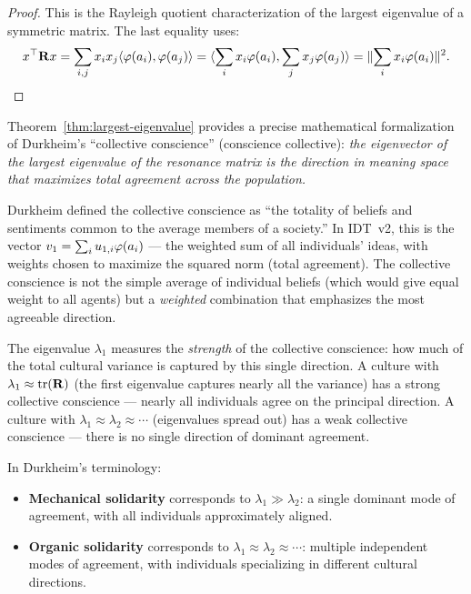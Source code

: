 \begin{proof}
This is the Rayleigh quotient characterization of the largest eigenvalue of
a symmetric matrix. The last equality uses:
\[
  x^\top \mathbf{R} x = \sum_{i,j} x_i x_j \langle \varphi(a_i), \varphi(a_j) \rangle
  = \langle \sum_i x_i \varphi(a_i), \sum_j x_j \varphi(a_j) \rangle
  = \lVert \sum_i x_i \varphi(a_i) \rVert^2.
\]
\end{proof}

\begin{interpretation}
\label{interp:durkheim}
Theorem~\ref{thm:largest-eigenvalue} provides a precise mathematical
formalization of Durkheim's ``collective conscience'' (conscience collective):
\emph{the eigenvector of the largest eigenvalue of the resonance matrix is the
direction in meaning space that maximizes total agreement across the
population.}

Durkheim defined the collective conscience as ``the totality of beliefs and
sentiments common to the average members of a society.'' In IDT~v2, this is
the vector $v_1 = \sum_i u_{1,i} \varphi(a_i)$ --- the weighted sum of all
individuals' ideas, with weights chosen to maximize the squared norm (total
agreement). The collective conscience is not the simple average of individual
beliefs (which would give equal weight to all agents) but a \emph{weighted}
combination that emphasizes the most agreeable direction.

The eigenvalue $\lambda_1$ measures the \emph{strength} of the collective
conscience: how much of the total cultural variance is captured by this single
direction. A culture with $\lambda_1 \approx \operatorname{tr}(\mathbf{R})$ (the
first eigenvalue captures nearly all the variance) has a strong collective
conscience --- nearly all individuals agree on the principal direction. A
culture with $\lambda_1 \approx \lambda_2 \approx \cdots$ (eigenvalues spread
out) has a weak collective conscience --- there is no single direction of
dominant agreement.

In Durkheim's terminology:
\begin{itemize}
\item \textbf{Mechanical solidarity} corresponds to $\lambda_1 \gg \lambda_2$:
a single dominant mode of agreement, with all individuals approximately aligned.
\item \textbf{Organic solidarity} corresponds to $\lambda_1 \approx \lambda_2
\approx \cdots$: multiple independent modes of agreement, with individuals
specializing in different cultural directions.
\end{itemize}
\end{interpretation}


